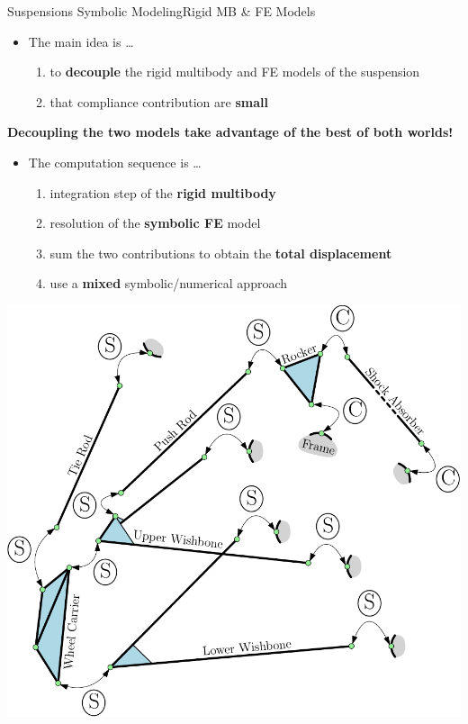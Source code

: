 \begin{frame}{Suspensions Symbolic Modeling}{Rigid \acs{MB} \& \acs{FE} Models}
  \begin{minipage}[c]{0.55\linewidth}
    \begin{itemize}
      \item The main idea is \dots
      \begin{enumerate}
        \item to \textbf{decouple} the rigid multibody and \acs{FE} models of the suspension
        \item that compliance contribution are \textbf{small}
      \end{enumerate}
    \end{itemize}
    \begin{center}\begin{minipage}{7.0cm}\begin{block}{}
      \centering
      \textcolor{fg_sl_color}{\textbf{Decoupling the two models take advantage of the best of both worlds!}}
    \end{block}\end{minipage}\vspace{1.0em}\end{center}
    \begin{itemize}
      \item The computation sequence is \dots
      \begin{enumerate}
        \item integration step of the \textbf{rigid multibody}
        \item resolution of the \textbf{symbolic \acs{FE}} model
        \item sum the two contributions to obtain the \textbf{total displacement}
        \item  use a \textbf{mixed} symbolic/numerical approach
      \end{enumerate}
    \end{itemize}
  \end{minipage}
  \begin{minipage}[c]{0.40\linewidth}
    \includegraphics[width=1.0\textwidth]{./figures/constraints.pdf}

\end{minipage}
\end{frame}
